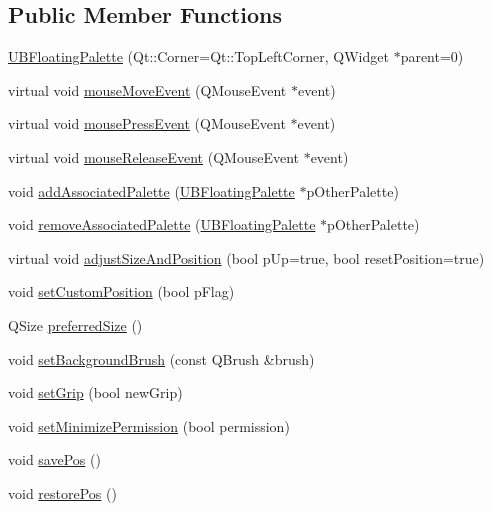 \subsection*{Public Member Functions}
\begin{DoxyCompactItemize}
\item 
\hyperlink{class_u_b_floating_palette_a0f6f20a3b1bb802881b939a19f42fb03}{U\-B\-Floating\-Palette} (Qt\-::\-Corner=Qt\-::\-Top\-Left\-Corner, Q\-Widget $\ast$parent=0)
\item 
virtual void \hyperlink{class_u_b_floating_palette_abf5f2e7b696a8a8e148b81a5cc13fb38}{mouse\-Move\-Event} (Q\-Mouse\-Event $\ast$event)
\item 
virtual void \hyperlink{class_u_b_floating_palette_a389fadd94a96a1bd50853a2d634bec9b}{mouse\-Press\-Event} (Q\-Mouse\-Event $\ast$event)
\item 
virtual void \hyperlink{class_u_b_floating_palette_a0753813a51d64397eb365d854a71491c}{mouse\-Release\-Event} (Q\-Mouse\-Event $\ast$event)
\item 
void \hyperlink{class_u_b_floating_palette_ab9607e6ef41b0c8e900cff9650b891ff}{add\-Associated\-Palette} (\hyperlink{class_u_b_floating_palette}{U\-B\-Floating\-Palette} $\ast$p\-Other\-Palette)
\item 
void \hyperlink{class_u_b_floating_palette_a02284dd9ea277ca6680fd06fb5d72bec}{remove\-Associated\-Palette} (\hyperlink{class_u_b_floating_palette}{U\-B\-Floating\-Palette} $\ast$p\-Other\-Palette)
\item 
virtual void \hyperlink{class_u_b_floating_palette_abc34a1ea7b29b6aaa4a0ea25d5715210}{adjust\-Size\-And\-Position} (bool p\-Up=true, bool reset\-Position=true)
\item 
void \hyperlink{class_u_b_floating_palette_abc8797caf59410a7fb11bc57e74ceb8d}{set\-Custom\-Position} (bool p\-Flag)
\item 
Q\-Size \hyperlink{class_u_b_floating_palette_aec5822b784da7d590ff463ed9cb44be9}{preferred\-Size} ()
\item 
void \hyperlink{class_u_b_floating_palette_a958e98a7fb70246060feece368d7b348}{set\-Background\-Brush} (const Q\-Brush \&brush)
\item 
void \hyperlink{class_u_b_floating_palette_a10dc3988c325dc35d8f381d341e17369}{set\-Grip} (bool new\-Grip)
\item 
void \hyperlink{class_u_b_floating_palette_a5fb44fc1c0c2ccdcd7d4db23680ae3cf}{set\-Minimize\-Permission} (bool permission)
\item 
void \hyperlink{class_u_b_floating_palette_abb0926b8eb8fa8efe5e5ca05ee20abc6}{save\-Pos} ()
\item 
void \hyperlink{class_u_b_floating_palette_a1d84529dc9179497ba4f91d00a86460e}{restore\-Pos} ()
\end{DoxyCompactItemize}
